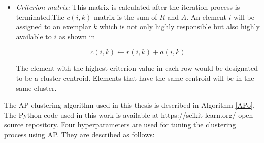 \begin{itemize}
  \item\textit{Criterion matrix:} This matrix is calculated after the iteration process is terminated.The $c (i,k)$ matrix is the sum of $R$ and $A$. An element $i$ will be assigned to an exemplar $k$ which is not only highly responsible but also highly available to $i$  as shown in 
    
    \begin{equation}
        c(i, k) \leftarrow r(i, k) + a(i, k)
    \end{equation}
    
  

The element with the highest criterion value in each row would be designated to be a cluster centroid. Elements that have the same centroid will be in the same cluster.







\end{itemize}

The AP clustering algorithm used in this thesis is described in Algorithm \ref{APo}. The Python code used in this work is available at https://scikit-learn.org/ open source repository. Four hyperparameters are used for tuning the clustering process using AP. They are described as follows: 

